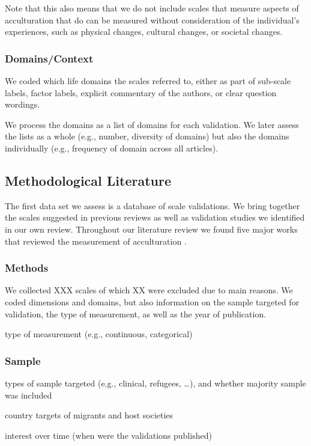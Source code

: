 \documentclass[man, 12pt, a4paper]{apa7}
\begin{document}


Note that this also means that we do not include scales that measure aspects of acculturation that do can be measured without consideration of the individual’s experiences, such as physical changes, cultural changes, or societal changes.
\subsubsection{Domains/Context}
We coded which life domains the scales referred to, either as part of sub-scale labels, factor labels, explicit commentary of the authors, or clear question wordings.

We process the domains as a list of domains for each validation. We later assess the lists as a whole (e.g., number, diversity of domains) but also the domains individually (e.g., frequency of domain across all articles).

\subsection{Methodological Literature}
The first data set we assess is a database of scale validations. We bring together the scales suggested in previous reviews as well as validation studies we identified in our own review. Throughout our literature review we found five major works that reviewed the measurement of acculturation \citep{Celenk2011, Maestas2000, Matsudaira2006, Wallace2010, Zane2004}.

\subsubsection{Methods}
We collected XXX scales of which XX were excluded due to main reasons. We coded dimensions and domains, but also information on the sample targeted for validation, the type of measurement, as well as the year of publication.

type of measurement (e.g., continuous, categorical)
\subsubsection{Sample}
types of sample targeted (e.g., clinical, refugees, …), and whether majority sample was included

country targets of migrants and host societies

interest over time (when were the validations published)
\end{document}
